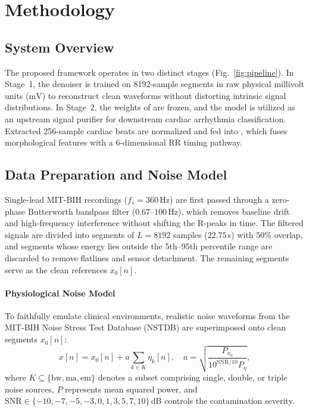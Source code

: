 \section{Methodology}
\label{sec:method}

\subsection{System Overview}
The proposed framework operates in two distinct stages (Fig.~\ref{fig:pipeline}). In Stage~1, the denoiser \HSL{} is trained on 8192-sample segments in raw physical millivolt units ($\mathrm{mV}$) to reconstruct clean waveforms without distorting intrinsic signal distributions. In Stage~2, the weights of \HSL{} are frozen, and the model is utilized as an upstream signal purifier for downstream cardiac arrhythmia classification. Extracted 256-sample cardiac beats are normalized and fed into \RRN{}, which fuses morphological features with a 6-dimensional RR timing pathway.

\subsection{Data Preparation and Noise Model}
\label{sec:preproc}
Single-lead MIT-BIH recordings ($f_s = 360$\,Hz) are first passed through a zero-phase Butterworth bandpass filter ($0.67$--$100$\,Hz), which removes baseline drift and high-frequency interference without shifting the R-peaks in time. The filtered signals are divided into segments of $L = 8192$ samples ($22.75$\,s) with $50\%$ overlap, and segments whose energy lies outside the 5th--95th percentile range are discarded to remove flatlines and sensor detachment. The remaining segments serve as the clean references $x_0[n]$.

\paragraph*{Physiological Noise Model}
To faithfully emulate clinical environments, realistic noise waveforms from the MIT-BIH Noise Stress Test Database (NSTDB) are superimposed onto clean segments $x_0[n]$:
\begin{equation}
x[n] = x_0[n] + a \sum_{k \in K} \eta_k[n], \quad a = \sqrt{\frac{P_{x_0}}{10^{\mathrm{SNR}/10} P_{\eta}}},
\label{eq:noise_model}
\end{equation}
where $K \subseteq \{\mathrm{bw}, \mathrm{ma}, \mathrm{em}\}$ denotes a subset comprising single, double, or triple noise sources, $P$ represents mean squared power, and $\mathrm{SNR} \in \{-10, -7, -5, -3, 0, 1, 3, 5, 7, 10\}$\,dB controls the contamination severity.

